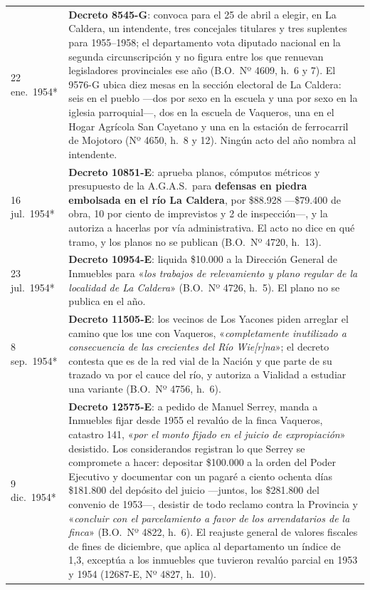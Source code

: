 \begin{longtable}{@{}p{2.7cm}p{10.3cm}@{}}
22 ene.\ 1954* & \textbf{Decreto 8545-G}: convoca para el 25 de abril a elegir, en La Caldera, un intendente, tres concejales titulares y tres suplentes para 1955--1958; el departamento vota diputado nacional en la segunda circunscripción y no figura entre los que renuevan legisladores provinciales ese año (B.O.\ Nº 4609, h.\ 6 y 7). El 9576-G ubica diez mesas en la sección electoral de La Caldera: seis en el pueblo ---dos por sexo en la escuela y una por sexo en la iglesia parroquial---, dos en la escuela de Vaqueros, una en el Hogar Agrícola San Cayetano y una en la estación de ferrocarril de Mojotoro (Nº 4650, h.\ 8 y 12). Ningún acto del año nombra al intendente. \\
16 jul.\ 1954* & \textbf{Decreto 10851-E}: aprueba planos, cómputos métricos y presupuesto de la A.G.A.S.\ para \textbf{defensas en piedra embolsada en el río La Caldera}, por \$88.928 ---\$79.400 de obra, 10 por ciento de imprevistos y 2 de inspección---, y la autoriza a hacerlas por vía administrativa. El acto no dice en qué tramo, y los planos no se publican (B.O.\ Nº 4720, h.\ 13). \\
23 jul.\ 1954* & \textbf{Decreto 10954-E}: liquida \$10.000 a la Dirección General de Inmuebles para «\textit{los trabajos de relevamiento y plano regular de la localidad de La Caldera}» (B.O.\ Nº 4726, h.\ 5). El plano no se publica en el año. \\
8 sep.\ 1954* & \textbf{Decreto 11505-E}: los vecinos de Los Yacones piden arreglar el camino que los une con Vaqueros, «\textit{completamente inutilizado a consecuencia de las crecientes del Río Wie[r]na}»; el decreto contesta que es de la red vial de la Nación y que parte de su trazado va por el cauce del río, y autoriza a Vialidad a estudiar una variante (B.O.\ Nº 4756, h.\ 6). \\
9 dic.\ 1954* & \textbf{Decreto 12575-E}: a pedido de Manuel Serrey\index{Serrey, Manuel}, manda a Inmuebles fijar desde 1955 el revalúo de la finca Vaqueros, catastro 141, «\textit{por el monto fijado en el juicio de expropiación}» desistido. Los considerandos registran lo que Serrey se compromete a hacer: depositar \$100.000 a la orden del Poder Ejecutivo y documentar con un pagaré a ciento ochenta días \$181.800 del depósito del juicio ---juntos, los \$281.800 del convenio de 1953---, desistir de todo reclamo contra la Provincia y «\textit{concluir con el parcelamiento a favor de los arrendatarios de la finca}» (B.O.\ Nº 4822, h.\ 6). El reajuste general de valores fiscales de fines de diciembre, que aplica al departamento un índice de 1,3, exceptúa a los inmuebles que tuvieron revalúo parcial en 1953 y 1954 (12687-E, Nº 4827, h.\ 10). \\

\end{longtable}
